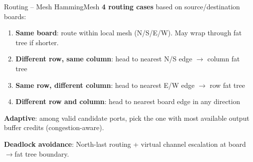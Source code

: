 \documentclass[t]{beamer}
\begin{document}
\begin{frame}{Routing -- Mesh HammingMesh}
    \textbf{4 routing cases} based on source/destination boards:

    \vspace{0.2cm}

    \begin{enumerate}
        \item \textbf{Same board}: route within local mesh (N/S/E/W). May wrap through fat tree if shorter.

        \item \textbf{Different row, same column}: head to nearest N/S edge $\to$ column fat tree

        \item \textbf{Same row, different column}: head to nearest E/W edge $\to$ row fat tree

        \item \textbf{Different row and column}: head to nearest board edge in any direction
    \end{enumerate}

    \vspace{0.2cm}

    \textbf{Adaptive}: among valid candidate ports, pick the one with most available output buffer credits (congestion-aware).

    \vspace{0.2cm}

    \textbf{Deadlock avoidance}: North-last routing + virtual channel escalation at board$\to$fat tree boundary.
\end{frame}
\end{document}
